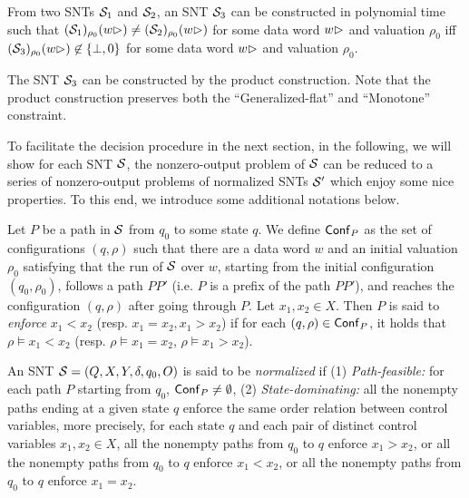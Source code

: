 \begin{proposition}\label{prop-snt-eqv-to-nzero}
From two SNTs ${\mathcal{S} }_1$ and ${\mathcal{S} }_2$, an SNT ${\mathcal{S} }_3$ can be constructed in polynomial time such that  $({\mathcal{S} }_1)_{\rho_0}(w\rhd) \neq ({\mathcal{S} }_2)_{\rho_0}(w\rhd)$ for some  data word $w \rhd$ and valuation $\rho_0$  iff $({\mathcal{S} }_3)_{\rho_0}(w\rhd) \not\in \{\bot,0\}$ for some data word $w\rhd$ and valuation $\rho_0$.
\end{proposition}
The SNT ${\mathcal{S} }_3$ can be constructed by the product construction. Note that the product construction preserves both the ``Generalized-flat'' and ``Monotone'' constraint. 

To facilitate the decision procedure in the next section, in the following, we will show for each SNT ${\mathcal{S} }$, the nonzero-output problem of ${\mathcal{S} }$ can be reduced to a series of nonzero-output problems of normalized SNTs ${\mathcal{S} }'$ which enjoy some nice properties. To this end, we introduce some additional notations below.


Let $P$ be a path in ${\mathcal{S} }$ from $q_0$ to some state $q$. We define ${\sf Conf}_P$ as the set of configurations $(q, \rho)$ such that there are a data word $w$ and an initial valuation $\rho_0$ satisfying that the run of ${\mathcal{S} }$ over $w$, starting from the initial configuration $(q_0, \rho_0)$, follows a path $P P'$ (i.e. $P$ is a prefix of the path $PP'$), and reaches the configuration $(q,\rho)$ after going through $P$. Let $x_1, x_2 \in X$. Then $P$ is said to \emph{enforce} $x_1 < x_2$ (resp. $x_1 = x_2, x_1 > x_2$) if for each $(q,\rho) \in {\sf Conf}_P$, it holds that $\rho \models x_1 < x_2$ (resp. $\rho \models x_1 = x_2$, $\rho \models x_1 > x_2$). 

An SNT ${\mathcal{S} }=(Q, X, Y, \delta, q_0, O)$ is said to be \emph{normalized} if (1) {\it Path-feasible:} for each path $P$ starting from $q_0$, ${\sf Conf}_P \neq \emptyset$, (2) {\it State-dominating:} all the nonempty paths ending at a given state $q$ enforce the same order relation between control variables, more precisely, for each state $q$ and each pair of distinct control variables $x_1, x_2 \in X$, all the nonempty paths  from $q_0$ to $q$ enforce $x_1 > x_2$, or all the nonempty paths from $q_0$ to $q$ enforce $x_1 < x_2$, or all the nonempty paths from $q_0$ to $q$ enforce $x_1 = x_2$.
%
%
%
%

